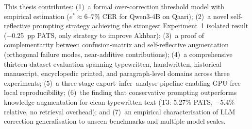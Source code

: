 This thesis contributes: (1)~a formal over-correction threshold model with
empirical estimation ($e^*\approx6$--$7\%$ CER for Qwen3-4B on Qaari);
(2)~a novel self-reflective prompting strategy achieving the strongest
Experiment~1 isolated result ($-$0.25~pp PATS, only strategy to improve
Akhbar); (3)~a proof of complementarity between confusion-matrix and
self-reflective augmentation (orthogonal failure modes, near-additive
contributions); (4)~a comprehensive thirteen-dataset evaluation spanning
typewritten, handwritten, historical manuscript, encyclopedic printed, and
paragraph-level domains across three experiments; (5)~a three-stage
export--infer--analyse pipeline enabling GPU-free local reproducibility;
(6)~the finding that conservative prompting outperforms knowledge augmentation
for clean typewritten text (T3: 5.27\% PATS, $-$5.4\% relative, no retrieval
overhead); and (7)~an empirical characterisation of LLM correction
generalisation to unseen benchmarks and multiple model scales.
